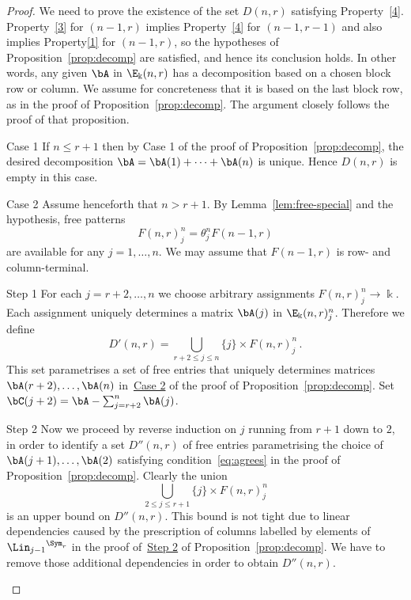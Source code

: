 \begin{proof}
We need to prove the existence of the set $D(n,r)$ satisfying
Property~\ref{4}. Property~\ref{3} for $(n-1,r)$ implies
Property~\ref{4} for $(n-1,r-1)$ and also implies Property\ref{1} for
$(n-1,r)$, so the hypotheses of Proposition~\ref{prop:decomp} are
satisfied, and hence its conclusion holds. In other words, any given
$\bA$ in $\E_\Bbbk(n,r)$ has a decomposition based on a chosen block
row or column. We assume for concreteness that it is based on the last
block row, as in the proof of Proposition~\ref{prop:decomp}. The
argument closely follows the proof of that proposition.

\begin{enonce*}[remark]{\hypertarget{prop6.13_C1}{Case 1}} If $n \le r+1$ then by Case 1 of
the proof of Proposition~\ref{prop:decomp}, the desired decomposition
$\bA = \bA(1) + \cdots+ \bA(n)$ is unique. Hence $D(n,r)$ is empty in
this case.
\end{enonce*}

\begin{enonce*}[remark]{\hypertarget{prop6.13_C1}{Case 2}} Assume henceforth that $n > r+1$.
By Lemma~\ref{lem:free-special} and the hypothesis, free patterns
\[F(n,r)^n_j = \theta^n_j F(n-1,r)\] are available for any
$j=1,\dots, n$. We may assume that $F(n-1,r)$ is row- and
column-terminal.
\end{enonce*}

\begin{enonce*}[remark]{\hypertarget{prop6.13_S1}{Step 1}} For each $j=r+2, \dots, n$ we choose arbitrary
assignments $F(n,r)^n_j \to \Bbbk$. Each assignment uniquely
determines a matrix $\bA(j)$ in $\E_\Bbbk(n,r)_j^n$. Therefore we
define
\begin{equation*}
D'(n,r) = \bigcup_{r+2 \le j \le n} \{j\}\times F(n,r)^n_j \, .
\end{equation*}
This set parametrises a set of free entries that uniquely determines
matrices $\bA(r+2), \dots, \bA(n)$ in~\hyperlink{Case 2}{Case 2} of the proof of
Proposition~\ref{prop:decomp}. Set $\bC(j+2) = \bA - \sum_{j=r+2}^n
\bA(j)$.
\end{enonce*}

\begin{enonce*}[remark]{\hypertarget{prop6.13_S1}{Step 2}} Now we proceed by reverse induction on $j$
running from $r+1$ down to $2$, in order to identify a set $D''(n,r)$
of free entries parametrising the choice of $\bA(j+1), \dots, \bA(2)$
satisfying condition~\eqref{eq:agrees} in the proof of Proposition~\ref{prop:decomp}. Clearly the union
\begin{equation*}\label{toomuch2}
\bigcup_{2\leq j \leq r+1} \{j\}\times F(n,r)^n_j 
\end{equation*}
is an upper bound on $D''(n,r)$. This bound is not tight due to linear
dependencies caused by the prescription of columns labelled by
elements of ${\Lin_{j-1}}^{\Sym_r}$ in the proof of~\hyperlink{Step 2}{Step 2} of
Proposition~\ref{prop:decomp}. We have to remove those additional
dependencies in order to obtain $D''(n,r)$.


\end{enonce*}
\end{proof}
